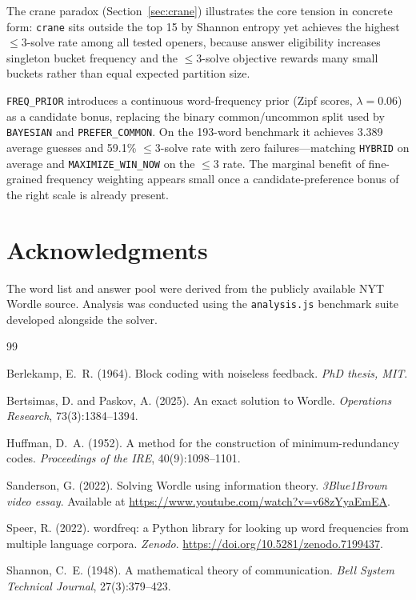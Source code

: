 \documentclass{article}
\begin{document}
The crane paradox (Section~\ref{sec:crane}) illustrates the core tension in
concrete form: \texttt{crane} sits outside the top 15 by Shannon entropy yet
achieves the highest $\leq 3$-solve rate among all tested openers, because answer
eligibility increases singleton bucket frequency and the $\leq 3$-solve objective
rewards many small buckets rather than equal expected partition size.

\texttt{FREQ\_PRIOR} introduces a continuous word-frequency prior (Zipf scores,
$\lambda = 0.06$) as a candidate bonus, replacing the binary common/uncommon
split used by \texttt{BAYESIAN} and \texttt{PREFER\_COMMON}. On the 193-word
benchmark it achieves 3.389 average guesses and 59.1\% $\leq 3$-solve rate with
zero failures---matching \texttt{HYBRID} on average and \texttt{MAXIMIZE\_WIN\_NOW}
on the $\leq 3$ rate. The marginal benefit of fine-grained frequency weighting
appears small once a candidate-preference bonus of the right scale is already present.

\section*{Acknowledgments}

The word list and answer pool were derived from the publicly available NYT Wordle
source. Analysis was conducted using the \texttt{analysis.js} benchmark suite
developed alongside the solver.


\begin{thebibliography}{99}

Berlekamp, E.~R. (1964).
\newblock Block coding with noiseless feedback.
\newblock \emph{PhD thesis, MIT}.

Bertsimas, D. and Paskov, A. (2025).
\newblock An exact solution to Wordle.
\newblock \emph{Operations Research}, 73(3):1384--1394.

Huffman, D.~A. (1952).
\newblock A method for the construction of minimum-redundancy codes.
\newblock \emph{Proceedings of the IRE}, 40(9):1098--1101.

Sanderson, G. (2022).
\newblock Solving Wordle using information theory.
\newblock \emph{3Blue1Brown video essay}. Available at \url{https://www.youtube.com/watch?v=v68zYyaEmEA}.

Speer, R. (2022).
\newblock wordfreq: a Python library for looking up word frequencies from
  multiple language corpora.
\newblock \emph{Zenodo}. \url{https://doi.org/10.5281/zenodo.7199437}.

Shannon, C.~E. (1948).
\newblock A mathematical theory of communication.
\newblock \emph{Bell System Technical Journal}, 27(3):379--423.

\end{thebibliography}
\end{document}
